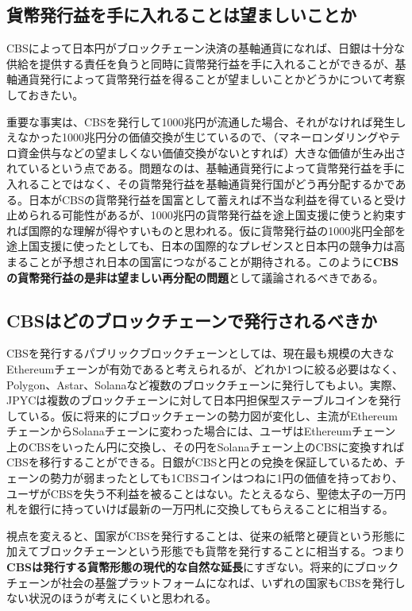 \documentclass[dvipdfmx,a4paper]{jsarticle}
\begin{document}
\subsection{貨幣発行益を手に入れることは望ましいことか}

CBSによって日本円がブロックチェーン決済の基軸通貨になれば、日銀は十分な供給を提供する責任を負うと同時に貨幣発行益を手に入れることができるが、基軸通貨発行によって貨幣発行益を得ることが望ましいことかどうかについて考察しておきたい。

重要な事実は、CBSを発行して1000兆円が流通した場合、それがなければ発生しえなかった1000兆円分の価値交換が生じているので、（マネーロンダリングやテロ資金供与などの望ましくない価値交換がないとすれば）大きな価値が生み出されているという点である。問題なのは、基軸通貨発行によって貨幣発行益を手に入れることではなく、その貨幣発行益を基軸通貨発行国がどう再分配するかである。日本がCBSの貨幣発行益を国富として蓄えれば不当な利益を得ていると受け止められる可能性があるが、1000兆円の貨幣発行益を途上国支援に使うと約束すれば国際的な理解が得やすいものと思われる。仮に貨幣発行益の1000兆円全部を途上国支援に使ったとしても、日本の国際的なプレゼンスと日本円の競争力は高まることが予想され日本の国富につながることが期待される。このように\textbf{CBSの貨幣発行益の是非は望ましい再分配の問題}として議論されるべきである。

\subsection{CBSはどのブロックチェーンで発行されるべきか}

CBSを発行するパブリックブロックチェーンとしては、現在最も規模の大きなEthereumチェーンが有効であると考えられるが、どれか1つに絞る必要はなく、Polygon、Astar、Solanaなど複数のブロックチェーンに発行してもよい。実際、JPYCは複数のブロックチェーンに対して日本円担保型ステーブルコインを発行している。仮に将来的にブロックチェーンの勢力図が変化し、主流がEthereumチェーンからSolanaチェーンに変わった場合には、ユーザはEthereumチェーン上のCBSをいったん円に交換し、その円をSolanaチェーン上のCBSに変換すればCBSを移行することができる。日銀がCBSと円との兌換を保証しているため、チェーンの勢力が弱まったとしても1CBSコインはつねに1円の価値を持っており、ユーザがCBSを失う不利益を被ることはない。たとえるなら、聖徳太子の一万円札を銀行に持っていけば最新の一万円札に交換してもらえることに相当する。

視点を変えると、国家がCBSを発行することは、従来の紙幣と硬貨という形態に加えてブロックチェーンという形態でも貨幣を発行することに相当する。つまり\textbf{CBSは発行する貨幣形態の現代的な自然な延長}にすぎない。将来的にブロックチェーンが社会の基盤プラットフォームになれば、いずれの国家もCBSを発行しない状況のほうが考えにくいと思われる。
\end{document}
